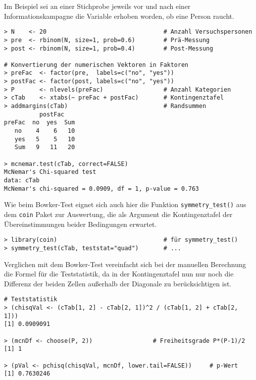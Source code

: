 Im Beispiel sei an einer Stichprobe jeweils vor und nach einer Informationskampagne die Variable erhoben worden, ob eine Person raucht.
\begin{lstlisting}
> N    <- 20                                 # Anzahl Versuchspersonen
> pre  <- rbinom(N, size=1, prob=0.6)        # Prä-Messung
> post <- rbinom(N, size=1, prob=0.4)        # Post-Messung

# Konvertierung der numerischen Vektoren in Faktoren
> preFac  <- factor(pre,  labels=c("no", "yes"))
> postFac <- factor(post, labels=c("no", "yes"))
> P       <- nlevels(preFac)                 # Anzahl Kategorien
> cTab    <- xtabs(~ preFac + postFac)       # Kontingenztafel
> addmargins(cTab)                           # Randsummen
          postFac
preFac  no  yes  Sum
   no    4    6   10
   yes   5    5   10
   Sum   9   11   20

> mcnemar.test(cTab, correct=FALSE)
McNemar's Chi-squared test
data: cTab
McNemar's chi-squared = 0.0909, df = 1, p-value = 0.763
\end{lstlisting}

Wie beim Bowker-Test eignet sich auch hier die Funktion \lstinline!symmetry_test()! aus dem \lstinline!coin! Paket zur Auswertung, die als Argument die Kontingenztafel der Übereinstimmungen beider Bedingungen erwartet.
\begin{lstlisting}
> library(coin)                              # für symmetry_test()
> symmetry_test(cTab, teststat="quad")       # ...
\end{lstlisting}

Verglichen mit dem Bowker-Test vereinfacht sich bei der manuellen Berechnung die Formel für die Teststatistik, da in der Kontingenztafel nun nur noch die Differenz der beiden Zellen außerhalb der Diagonale zu berücksichtigen ist.
\begin{lstlisting}
# Teststatistik
> (chisqVal <- (cTab[1, 2] - cTab[2, 1])^2 / (cTab[1, 2] + cTab[2, 1]))
[1] 0.0909091

> (mcnDf <- choose(P, 2))                 # Freiheitsgrade P*(P-1)/2
[1] 1

> (pVal <- pchisq(chisqVal, mcnDf, lower.tail=FALSE))     # p-Wert
[1] 0.7630246
\end{lstlisting}

